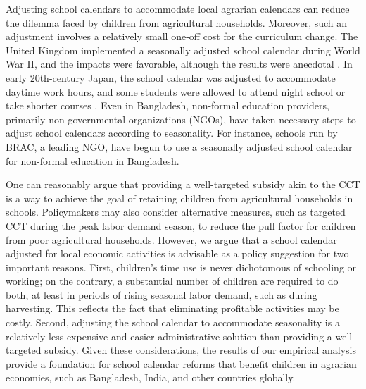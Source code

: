 \documentclass[12pt,letterpaper]{article}\usepackage[margin=1in]{geometry}
\newcommand{\0}{\ensuremath{\mbox{\boldmath $0$}}}
\begin{document}
Adjusting school calendars to accommodate local agrarian calendars can reduce the dilemma faced by children from agricultural households. Moreover, such an adjustment involves a relatively small one-off cost for the curriculum change. The United Kingdom implemented a seasonally adjusted school calendar during World War II, and the impacts were favorable, although the results were anecdotal \citep[][190-191]{Moore2004}. In early 20th-century Japan, the school calendar was adjusted to accommodate daytime work hours, and some students were allowed to attend night school or take shorter courses \citep[][Chapter 3]{JICA2004}. Even in Bangladesh, non-formal education providers, primarily non-governmental organizations (NGOs), have taken necessary steps to adjust school calendars according to seasonality. For instance, schools run by BRAC, a leading NGO, have begun to use a seasonally adjusted school calendar for non-formal education in Bangladesh.

One can reasonably argue that providing a well-targeted subsidy akin to the CCT is a way to achieve the goal of retaining children from agricultural households in schools. Policymakers may also consider alternative measures, such as targeted CCT during the peak labor demand season, to reduce the pull factor for children from poor agricultural households. However, we argue that a school calendar adjusted for local economic activities is advisable as a policy suggestion for two important reasons. First, children's time use is never dichotomous of schooling or working; on the contrary, a substantial number of children are required to do both, at least in periods of rising seasonal labor demand, such as during harvesting. This reflects the fact that eliminating profitable activities may be costly. Second, adjusting the school calendar to accommodate seasonality is a relatively less expensive and easier administrative solution than providing a well-targeted subsidy. Given these considerations, the results of our empirical analysis provide a foundation for school calendar reforms that benefit children in agrarian economies, such as Bangladesh, India, and other countries globally.




\pagebreak

\doublespacing



\pagebreak
\renewcommand{\thefigure}{A\arabic{figure}}
\renewcommand{\theHfigure}{A\arabic{figure}}
\setcounter{figure}{0}

\renewcommand{\thetable}{A\arabic{table}}
\renewcommand{\theHtable}{A\arabic{table}}
\setcounter{table}{0}
\end{document}
